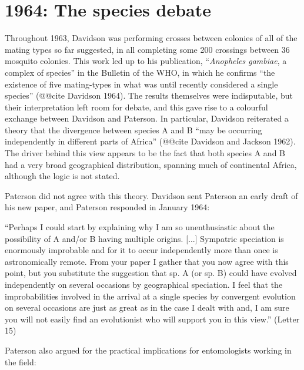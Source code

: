 \documentclass[a4paper,11pt,abstracton,hidelinks]{scrartcl}
\begin{document}
\section{1964: The species debate}


Throughout 1963, Davidson was performing crosses between colonies of all of the mating types so far suggested, in all completing some 200 crossings between 36 mosquito colonies. This work led up to his publication, ``\textit{Anopheles gambiae}, a complex of species'' in the Bulletin of the WHO, in which he confirms ``the existence of five mating-types in what was until recently considered a single species'' (@@cite Davidson 1964). The results themselves were indisputable, but their interpretation left room for debate, and this gave rise to a colourful exchange between Davidson and Paterson. In particular, Davidson reiterated a theory that the divergence between species A and B ``may be occurring independently in different parts of Africa'' (@@cite Davidson and Jackson 1962). The driver behind this view appears to be the fact that both species A and B had a very broad geographical distribution, spanning much of continental Africa, although the logic is not stated.


Paterson did not agree with this theory. Davidson sent Paterson an early draft of his new paper, and Paterson responded in January 1964:


\begin{displayquote}
``Perhaps I could start by explaining why I am so unenthusiastic about the possibility of A and/or B having multiple origins. [...] Sympatric speciation is enormously improbable and for it to occur independently more than once is astronomically remote. From your paper I gather that you now agree with this point, but you substitute the suggestion that sp. A (or sp. B) could have evolved independently on several occasions by geographical speciation. I feel that the improbabilities involved in the arrival at a single species by convergent evolution on several occasions are just as great as in the case I dealt with and, I am sure you will not easily find an evolutionist who will support you in this view.'' (Letter 15)
\end{displayquote}


Paterson also argued for the practical implications for entomologists working in the field:
\end{document}

